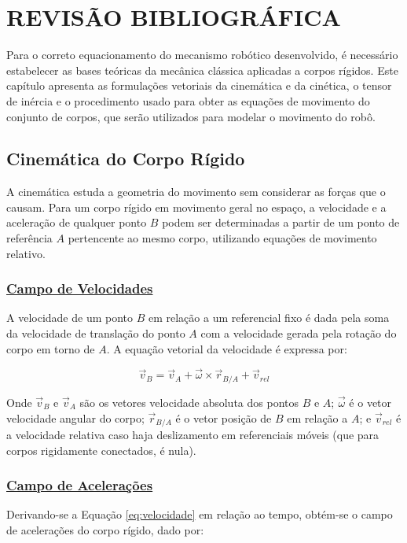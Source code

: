 \chapter{REVISÃO BIBLIOGRÁFICA}
\label{chapter:revisao}

Para o correto equacionamento do mecanismo robótico desenvolvido, é necessário estabelecer as bases teóricas da mecânica clássica aplicadas a corpos rígidos. Este capítulo apresenta as formulações vetoriais da cinemática e da cinética, o tensor de inércia e o procedimento usado para obter as equações de movimento do conjunto de corpos, que serão utilizados para modelar o movimento do robô.

\section{\textbf{Cinemática do Corpo Rígido}}
\label{sec:cinematica}

A cinemática estuda a geometria do movimento sem considerar as forças que o causam. Para um corpo rígido em movimento geral no espaço, a velocidade e a aceleração de qualquer ponto $B$ podem ser determinadas a partir de um ponto de referência $A$ pertencente ao mesmo corpo, utilizando equações de movimento relativo.

\subsection{\underline{Campo de Velocidades}}
A velocidade de um ponto $B$ em relação a um referencial fixo é dada pela soma da velocidade de translação do ponto $A$ com a velocidade gerada pela rotação do corpo em torno de $A$. A equação vetorial da velocidade é expressa por:

\begin{equation}
  \vec{v}_B = \vec{v}_A + \vec{\omega} \times \vec{r}_{B/A} + \vec{v}_{rel}
  \label{eq:velocidade}
\end{equation}

Onde $\vec{v}_B$ e $\vec{v}_A$ são os vetores velocidade absoluta dos pontos $B$ e $A$; $\vec{\omega}$ é o vetor velocidade angular do corpo; $\vec{r}_{B/A}$ é o vetor posição de $B$ em relação a $A$; e $\vec{v}_{rel}$ é a velocidade relativa caso haja deslizamento em referenciais móveis (que para corpos rigidamente conectados, é nula).

\subsection{\underline{Campo de Acelerações}}
Derivando-se a Equação \ref{eq:velocidade} em relação ao tempo, obtém-se o campo de acelerações do corpo rígido, dado por:

